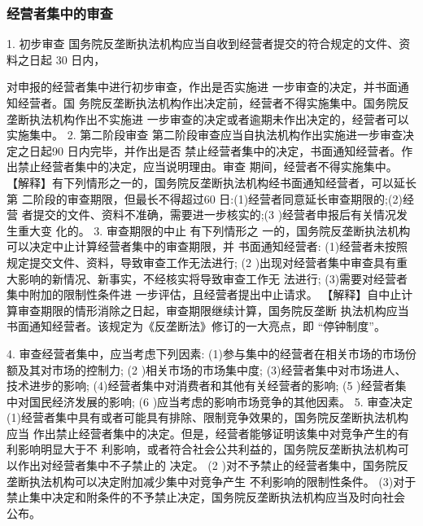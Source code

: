 \documentclass[UTF8,12pt]{ctexart}
\numberwithin{equation}{section} %
\numberwithin{figure}{section}
\numberwithin{table}{section}
\begin{document}
	
	\subsubsection{经营者集中的审查}
	
	1. 初步审查 国务院反垄断执法机构应当自收到经营者提交的符合规定的文件、资料之日起 30 日内，
	
	 对申报的经营者集中进行初步审查，作出是否实施进 一步审查的决定，并书面通知经营者。国 务院反垄断执法机构作出决定前，经营者不得实施集中。国务院反垄断执法机构作出不实施进 一步审查的决定或者逾期未作出决定的，经营者可以实施集中。
	2. 第二阶段审查
	第二阶段审查应当自执法机构作出实施进一步审查决定之日起90 日内完毕，并作出是否 禁止经营者集中的决定，书面通知经营者。作出禁止经营者集中的决定，应当说明理由。审查 期间，经营者不得实施集中。
	【解释】有下列情形之一的，国务院反垄断执法机构经书面通知经营者，可以延长第 二阶段的审查期限，但最长不得超过60 日:(1)经营者同意延长审查期限的;(2)经营 者提交的文件、资料不准确，需要进一步核实的;(3 )经营者申报后有关情况发生重大变 化的。
	3. 审查期限的中止
	有下列情形之 一的，国务院反垄断执法机构可以决定中止计算经营者集中的审查期限，并 书面通知经营者:
	(1)经营者未按照规定提交文件、资料，导致审查工作无法进行;
	(2 )出现对经营者集中审查具有重大影响的新情况、新事实，不经核实将导致审查工作无 法进行;
	(3)需要对经营者集中附加的限制性条件进 一步评估，且经营者提出中止请求。
	【解释】自中止计算审查期限的情形消除之日起，审查期限继续计算，国务院反垄断 执法机构应当书面通知经营者。该规定为《反垄断法》修订的一大亮点，即 “停钟制度”。
	
	4. 审查经营者集中，应当考虑下列因素: (1)参与集中的经营者在相关市场的市场份额及其对市场的控制力;
	(2 )相关市场的市场集中度;
	(3)经营者集中对市场进人、技术进步的影响; (4)经营者集中对消费者和其他有关经营者的影响;
	(5 )经营者集中对国民经济发展的影响;
	(6 )应当考虑的影响市场竞争的其他因素。
	5. 审查决定 (1)经营者集中具有或者可能具有排除、限制竞争效果的，国务院反垄断执法机构应当 作出禁止经营者集中的决定。但是，经营者能够证明该集中对竞争产生的有利影响明显大于不 利影响，或者符合社会公共利益的，国务院反垄断执法机构可以作出对经营者集中不子禁止的 决定。
	(2 )对不予禁止的经营者集中，国务院反垄断执法机构可以决定附加减少集中对竞争产生 不利影响的限制性条件。 (3)对于禁止集中决定和附条件的不予禁止决定，国务院反垄断执法机构应当及时向社会 公布。
	
	
	
\end{document}
